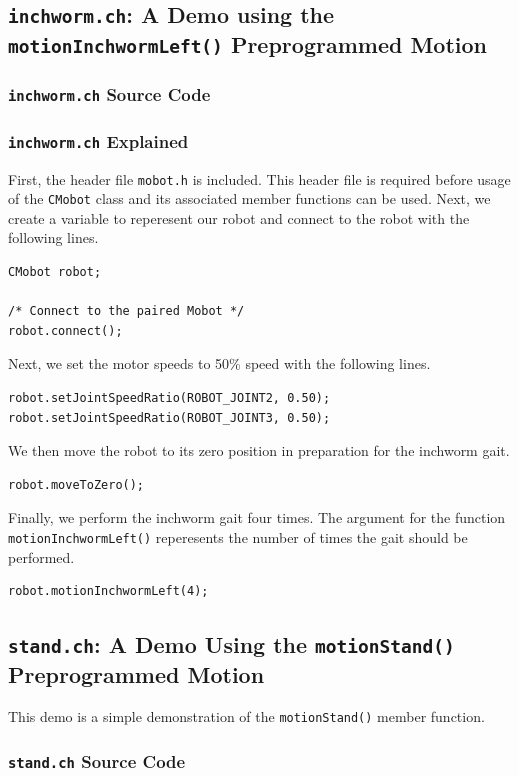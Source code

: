 \documentclass{article}
\begin{document}
\subsection{\texttt{inchworm.ch}: A Demo using the \texttt{motionInchwormLeft()}
Preprogrammed Motion}
\subsubsection{\texttt{inchworm.ch} Source Code}

\subsubsection{\texttt{inchworm.ch} Explained}
First, the header file \texttt{mobot.h} is included. This header file
is required before usage of the \texttt{CMobot} class and its associated
member functions can be used. Next, we create a variable to reperesent our
robot and connect to the robot with the following lines.
\begin{verbatim}
CMobot robot;

/* Connect to the paired Mobot */
robot.connect();
\end{verbatim}

Next, we set the motor speeds to 50\% speed with the following lines.
\begin{verbatim}
robot.setJointSpeedRatio(ROBOT_JOINT2, 0.50);
robot.setJointSpeedRatio(ROBOT_JOINT3, 0.50);
\end{verbatim}

We then move the robot to its zero position in preparation for the 
inchworm gait.
\begin{verbatim}
robot.moveToZero();
\end{verbatim}

Finally, we perform the inchworm gait four times. The argument for the
function \texttt{motionInchwormLeft()} reperesents the number of times
the gait should be performed.
\begin{verbatim}
robot.motionInchwormLeft(4);
\end{verbatim}


\subsection{\texttt{stand.ch}: A Demo Using the \texttt{motionStand()} Preprogrammed
Motion}
This demo is a simple demonstration of the \texttt{motionStand()} member function.
\subsubsection{\texttt{stand.ch} Source Code}

\end{document}

